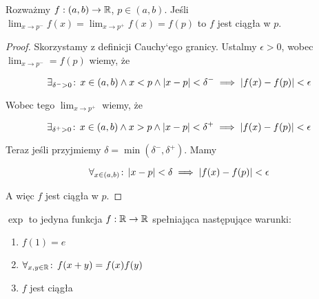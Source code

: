 \documentclass[9pt]{article}
\begin{document}
\begin{Twi}
    Rozważmy $f: (a, b) \to \mathbb{R}$, $p \in (a, b)$.
    Jeśli $\lim_{x \to p^-} f(x) = \lim_{x \to p^+} f(x) = f(p)$
    to $f$ jest ciągła w $p$.
\end{Twi}

\begin{proof}

    Skorzystamy z definicji Cauchy`ego granicy. Ustalmy $\epsilon > 0$, wobec
    $\lim_{x \to p^-} = f(p)$ wiemy, że

    \[
        \exists_{\delta^- > 0} \! : \, x \in (a,b) \land x < p \land |x - p| < \delta^-
        \implies
        |f(x) - f(p)| < \epsilon
    \]

    Wobec tego $\lim_{x \to p^+}$ wiemy, że

    \[
        \exists_{\delta^+ > 0} \! : \, x \in (a,b) \land x > p \land |x - p| < \delta^+
        \implies
        |f(x) - f(p)| < \epsilon
    \]

    Teraz jeśli przyjmiemy $\delta = \min (\delta^-, \delta^+)$. Mamy 

    \[
        \forall_{x \in (a,b)} \! : \, |x-p| < \delta
        \implies
        \left|f(x) - f(p)\right| < \epsilon
    \]

    A więc $f$ jest ciągła w $p$.
\end{proof}

\begin{Twi} 
     $\exp$ to jedyna funkcja $f: \mathbb{R} \to \mathbb{R}$ spełniająca następujące warunki:
     \begin{enumerate}
        \item $f(1) = e$
        \item $\forall_{x, y \in \mathbb{R}} \! : \, f(x+y) = f(x) f(y)$
        \item $f$ jest ciągła
     \end{enumerate}
\end{Twi}
\end{document}
